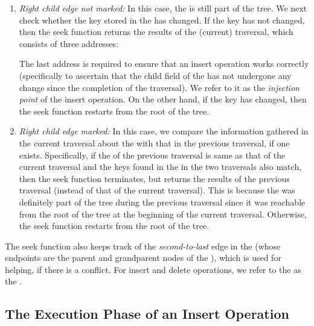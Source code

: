 \begin{limitscope}
\begin{enumerate}[leftmargin=*, label=(\alph*), noitemsep]
\item \emph{Right child edge not marked:}
In this case, the \anchornode{} is still part of the tree. We next check whether the key stored in the \anchornode{} has changed. If the key has not changed, then the seek function returns the results of the (current) traversal, which consists of three addresses:
The last address is required to ensure that an insert operation works correctly (specifically to ascertain that the child field of the \terminalnode{} has not undergone any change since the completion of the traversal). We refer to it as the \emph{injection point} of the insert operation. On the other hand, if the key has changed, then the seek function restarts from the root of the tree. 


\item \emph{Right child edge marked:}
In this case, we compare the information gathered in the current traversal about the \anchornode{} with that in the previous traversal, if one exists. Specifically, if the \anchornode{} of the previous traversal is same as that of the current traversal  and the keys found in the \anchornode{} in the two traversals also match, then the seek function terminates, but returns the results of the previous traversal (instead of that of the current traversal). This is because the \anchornode{} was definitely part of the tree during the previous traversal since it was reachable from the root of the tree at the beginning of the current traversal. Otherwise, the seek function restarts from the root of the tree.  
\end{enumerate}

The seek function also keeps track of the \emph{second-to-last} edge in the \accesspath{} (whose endpoints are the parent and grandparent nodes of the \terminalnode), which 
is used for helping, if there is a conflict. For insert and delete operations, we refer to the \terminalnode{} as the \emph{\targetnode}. 

\subsection{The Execution Phase of an Insert Operation}


\end{limitscope}
